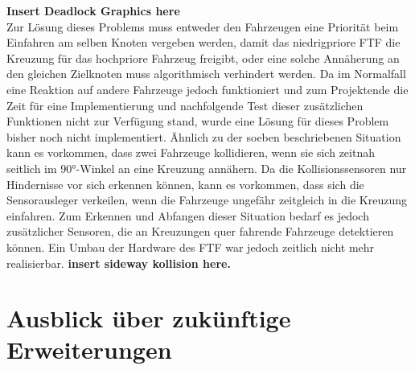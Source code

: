 		\textbf{Insert Deadlock Graphics here}
		\\
		
		Zur Lösung dieses Problems muss entweder den Fahrzeugen eine Priorität beim Einfahren am selben Knoten vergeben werden, damit das niedrigpriore \ac{FTF} die Kreuzung für das hochpriore Fahrzeug freigibt, oder eine solche Annäherung an den gleichen Zielknoten muss algorithmisch verhindert werden. Da im Normalfall eine Reaktion auf andere Fahrzeuge jedoch funktioniert und zum Projektende die Zeit für eine Implementierung und nachfolgende Test dieser zusätzlichen Funktionen nicht zur Verfügung stand, wurde eine Lösung für dieses Problem bisher noch nicht implementiert. 
		Ähnlich zu der soeben beschriebenen Situation kann es vorkommen, dass zwei Fahrzeuge kollidieren, wenn sie sich zeitnah seitlich im 90°-Winkel an eine Kreuzung annähern. Da die Kollisionssensoren nur Hindernisse vor sich erkennen können, kann es vorkommen, dass sich die Sensorausleger verkeilen, wenn die Fahrzeuge ungefähr zeitgleich in die Kreuzung einfahren. Zum Erkennen und Abfangen dieser Situation bedarf es jedoch zusätzlicher Sensoren, die an Kreuzungen quer fahrende Fahrzeuge detektieren können. Ein Umbau der Hardware des \ac{FTF} war jedoch zeitlich nicht mehr realisierbar.
		\textbf{insert sideway kollision here.}
	
\section{Ausblick über zukünftige Erweiterungen}
	
